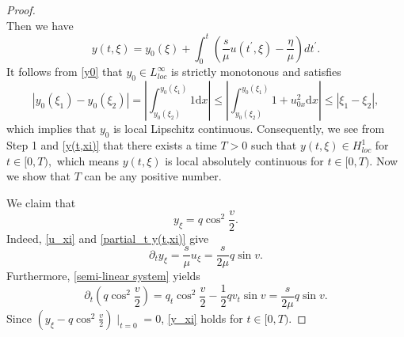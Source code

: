 \documentclass[10pt]{article}
\numberwithin{equation}{section}
\begin{document}
\begin{proof}
\begin{equation}
		\end{equation}
		Then we have
		\begin{equation}\label{y(t,xi)}
			y(t,\xi)=y_0(\xi)+\int_{0}^{t}\left(\frac{s}{\mu}u(t^{\prime},\xi)-\frac{\eta}{\mu}\right)dt^{\prime}.
		\end{equation}
		It follows from \eqref{y0} that $y_0\in L^\infty_{loc}$ is strictly monotonous and satisfies
		$$|y_0(\xi_1)-y_0(\xi_2)|=\left|\int_{y_0(\xi_2)}^{y_0(\xi_1)}1\mathrm{d}x\right|\leq\left|\int_{y_0(\xi_2)}^{y_0(\xi_1)}1+u_{0x}^2\mathrm{d}x\right|\leq|\xi_1-\xi_2|,$$
		which implies that $y_0$ is local Lipschitz continuous.	Consequently, we see from Step 1 and \eqref{y(t,xi)} that there exists a time $T>0$ such that $y(t,\xi)\in H^1_{loc}$ for $t\in[0,T),$ which means $y(t,\xi)$ is local absolutely continuous for $t\in[0,T)$. Now we show that $T$ can be any positive number.
		
		We claim that 
		\begin{equation}\label{y_xi}
			y_\xi=q\cos^2\frac{v}{2}.
		\end{equation}
		Indeed, \eqref{u_xi} and \eqref{partial_t y(t,xi)} give
		$$\partial_t y_\xi=\frac{s}{\mu}u_\xi=\frac{s}{2\mu}q\sin v.$$
		Furthermore, \eqref{semi-linear system} yields
		$$\partial_t\left(q\cos^2\frac{v}{2}\right)=q_t\cos^2\frac{v}{2}-\frac{1}{2}qv_t\sin v=\frac{s}{2\mu}q\sin v.$$
		Since $(y_\xi-q\cos^2\frac{v}{2})\mid_{t=0}=0$, \eqref{y_xi} holds for $t\in[0,T)$.
		

\end{proof}
\end{document}
